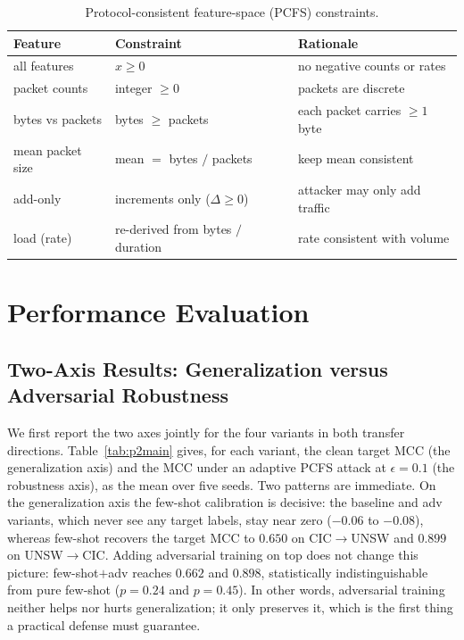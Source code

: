 \documentclass[11pt,a4paper]{article}
\begin{document}
\begin{table}[htbp]
\centering
\caption{Protocol-consistent feature-space (PCFS) constraints.}
\label{tab:constraint}
\footnotesize
\begin{tabular}{lll}
\toprule
Feature & Constraint & Rationale \\
\midrule
all features        & $x \ge 0$                          & no negative counts or rates \\
packet counts       & integer $\ge 0$                    & packets are discrete \\
bytes vs packets    & bytes $\ge$ packets                & each packet carries $\ge 1$ byte \\
mean packet size    & mean $=$ bytes $/$ packets         & keep mean consistent \\
add-only            & increments only ($\Delta \ge 0$)   & attacker may only add traffic \\
load (rate)         & re-derived from bytes $/$ duration & rate consistent with volume \\
\bottomrule
\end{tabular}
\end{table}

\section{Performance Evaluation}

\subsection{Two-Axis Results: Generalization versus Adversarial Robustness}
\label{sec:twoaxis}
We first report the two axes jointly for the four variants in both transfer
directions. Table~\ref{tab:p2main} gives, for each variant, the clean target MCC
(the generalization axis) and the MCC under an adaptive PCFS attack at
$\epsilon{=}0.1$ (the robustness axis), as the mean over five seeds. Two patterns are
immediate. On the generalization axis the few-shot calibration is decisive: the
baseline and adv variants, which never see any target labels, stay near zero
($-0.06$ to $-0.08$), whereas few-shot recovers the target MCC to $0.650$ on
CIC$\rightarrow$UNSW and $0.899$ on UNSW$\rightarrow$CIC. Adding adversarial training
on top does not change this picture: few-shot$+$adv reaches $0.662$ and $0.898$,
statistically indistinguishable from pure few-shot ($p{=}0.24$ and $p{=}0.45$). In
other words, adversarial training neither helps nor hurts generalization; it only
preserves it, which is the first thing a practical defense must guarantee.
\end{document}
